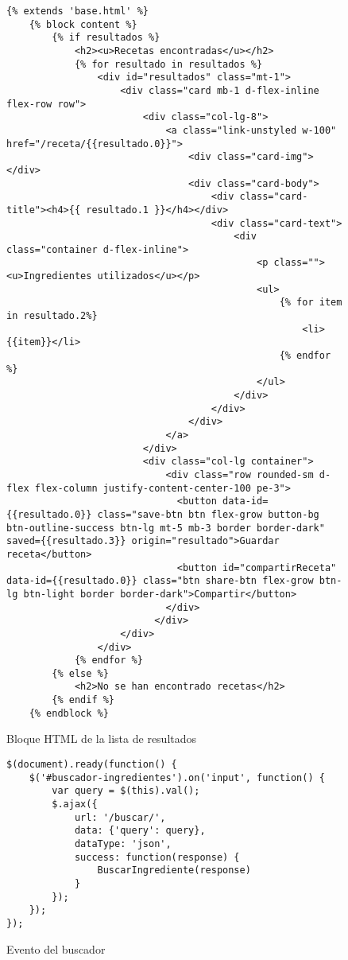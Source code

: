 \begin{figure}[H]
\begin{lstlisting}[style=consola]
    {% extends 'base.html' %}
    {% block content %}
        {% if resultados %}
            <h2><u>Recetas encontradas</u></h2>
            {% for resultado in resultados %}
                <div id="resultados" class="mt-1">
                    <div class="card mb-1 d-flex-inline flex-row row">
                        <div class="col-lg-8">
                            <a class="link-unstyled w-100" href="/receta/{{resultado.0}}">
                                <div class="card-img"></div>
                                <div class="card-body">
                                    <div class="card-title"><h4>{{ resultado.1 }}</h4></div>
                                    <div class="card-text">
                                        <div class="container d-flex-inline">
                                            <p class=""><u>Ingredientes utilizados</u></p>
                                            <ul>
                                                {% for item in resultado.2%}
                                                    <li>{{item}}</li>
                                                {% endfor %}
                                            </ul>
                                        </div>
                                    </div>
                                </div>
                            </a>
                        </div>
                        <div class="col-lg container">
                            <div class="row rounded-sm d-flex flex-column justify-content-center-100 pe-3">
                              <button data-id={{resultado.0}} class="save-btn btn flex-grow button-bg btn-outline-success btn-lg mt-5 mb-3 border border-dark" saved={{resultado.3}} origin="resultado">Guardar receta</button>
                              <button id="compartirReceta" data-id={{resultado.0}} class="btn share-btn flex-grow btn-lg btn-light border border-dark">Compartir</button>
                            </div>
                          </div>
                    </div>
                </div>
            {% endfor %}
        {% else %}
            <h2>No se han encontrado recetas</h2>
        {% endif %}
    {% endblock %}
\end{lstlisting}
\caption{Bloque HTML de la lista de resultados}
\label{sni:resultados}
\end{figure}

\begin{figure}[H]
\begin{lstlisting}[style=consola]
$(document).ready(function() {
    $('#buscador-ingredientes').on('input', function() {
        var query = $(this).val();
        $.ajax({
            url: '/buscar/',
            data: {'query': query},
            dataType: 'json',
            success: function(response) {
                BuscarIngrediente(response)
            }
        });
    });
});
\end{lstlisting}
\caption{Evento del buscador}
\label{sni:evnt-buscador}
\end{figure}

